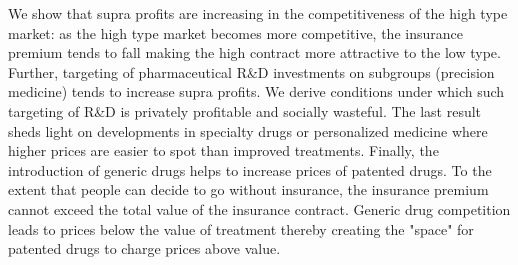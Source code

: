 \documentclass[a4paper,12pt]{article}
\begin{document}
We show that supra profits are increasing in the competitiveness of the high type market: as the high type market becomes more competitive, the insurance premium tends to fall making the high contract more attractive to the low type. Further, targeting of pharmaceutical R\&D investments on subgroups (precision medicine) tends to increase supra profits. We derive conditions under which such targeting of R\&D is privately profitable and socially wasteful. The last result sheds light on developments in specialty drugs or personalized medicine where higher prices are easier to spot than improved treatments. Finally, the introduction of generic drugs helps to increase prices of patented drugs. To the extent that people can decide to go without insurance, the insurance premium cannot exceed the total value of the insurance contract. Generic drug competition leads to prices below the value of treatment thereby creating the "space" for patented drugs to charge prices above value.
\end{document}

